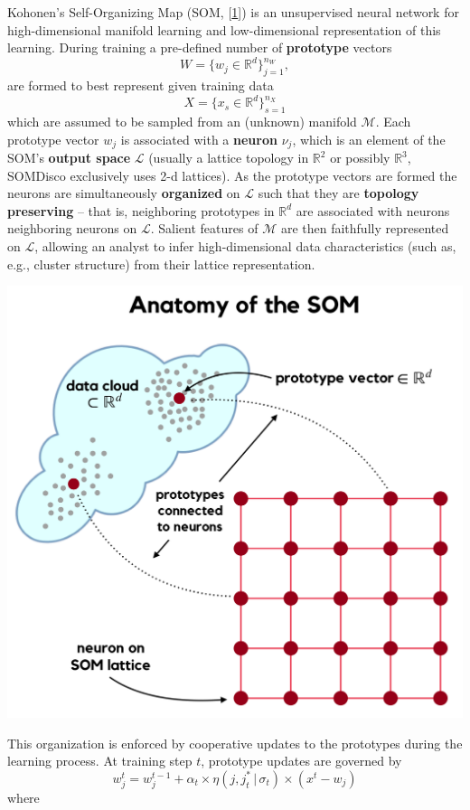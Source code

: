 \documentclass[]{article}
\begin{document}
Kohonen's Self-Organizing Map (SOM, {[}\protect\hyperlink{ref-Kohonen2001}{1}{]}) is an unsupervised neural network for high-dimensional manifold learning and low-dimensional representation of this learning. During training a pre-defined number of \textbf{prototype} vectors
\[W = \{w_j \in \mathbb{R}^d \}_{j=1}^{n_W}, \]
are formed to best represent given training data
\[ X = \{x_s \in \mathbb{R}^d \}_{s=1}^{n_X} \]
which are assumed to be sampled from an (unknown) manifold \(\mathcal{M}\). Each prototype vector \(w_j\) is associated with a \textbf{neuron} \(\nu_j\), which is an element of the SOM's \textbf{output space} \(\mathcal{L}\) (usually a lattice topology in \(\mathbb{R}^2\) or possibly \(\mathbb{R}^3\), SOMDisco exclusively uses 2-d lattices). As the prototype vectors are formed the neurons are simultaneously \textbf{organized} on \(\mathcal{L}\) such that they are \textbf{topology preserving} -- that is, neighboring prototypes in \(\mathbb{R}^d\) are associated with neurons neighboring neurons on \(\mathcal{L}\). Salient features of \(\mathcal{M}\) are then faithfully represented on \(\mathcal{L}\), allowing an analyst to infer high-dimensional data characteristics (such as, e.g., cluster structure) from their lattice representation.

\begin{center}\includegraphics[width=0.7\linewidth]{./figs/som_anatomy} \end{center}

This organization is enforced by cooperative updates to the prototypes during the learning process. At training step \(t\), prototype updates are governed by
\[ w_j^{t} = w_j^{t-1} + \alpha_t \times \eta(j, j^*_t \, | \, \sigma_t) \times (x^t - w_j) \]
where
\end{document}
